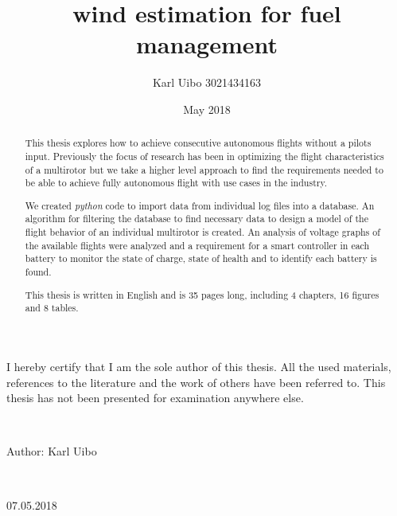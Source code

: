\documentclass[12pt,oneside]{reedthesis}
\title{wind estimation for fuel management}
\author{Karl Uibo 3021434163}
\date{May 2018}
\theoremstyle{definition}
\theoremstyle{definition}
\theoremstyle{definition}
\theoremstyle{remark}
\begin{document}
  \maketitle
  \begin{originality}
    I hereby certify that I am the sole author of this thesis. All the used
    materials, references to the literature and the work of others have been
    referred to. This thesis has not been presented for examination anywhere
    else.
    
    ~
    
    Author: Karl Uibo
    
    ~
    
    07.05.2018
  \end{originality}
  \begin{abstract}
    This thesis explores how to achieve consecutive autonomous flights
    without a pilots input. Previously the focus of research has been in
    optimizing the flight characteristics of a multirotor but we take a
    higher level approach to find the requirements needed to be able to
    achieve fully autonomous flight with use cases in the industry.
    
    We created \emph{python} code to import data from individual log files
    into a database. An algorithm for filtering the database to find
    necessary data to design a model of the flight behavior of an individual
    multirotor is created. An analysis of voltage graphs of the available
    flights were analyzed and a requirement for a smart controller in each
    battery to monitor the state of charge, state of health and to identify
    each battery is found.
    
    This thesis is written in English and is 35 pages long, including 4
    chapters, 16 figures and 8 tables.
  \end{abstract}
\end{document}
